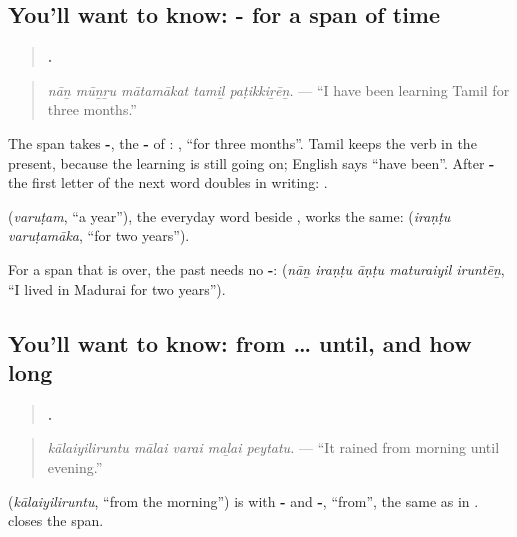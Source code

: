 \subsection*{You'll want to know: - for a span of time}
\begin{quote}
\textbf{    .}
\end{quote}

\begin{quote}
\emph{nāṉ mūṉṟu mātamākat tamiḻ paṭikkiṟēṉ.} — \textquotedblleft{}I have been learning Tamil for three months.\textquotedblright{}
\end{quote}

The span takes \textbf{-}, the \textbf{-} of \textbf{}: \textbf{ }, \textquotedblleft{}for three months\textquotedblright{}. Tamil keeps the verb in the present, because the learning is still going on; English says \textquotedblleft{}have been\textquotedblright{}. After \textbf{-} the first letter of the next word doubles in writing: \textbf{ }.

\textbf{} (\emph{varuṭam}, \textquotedblleft{}a year\textquotedblright{}), the everyday word beside \textbf{}, works the same: \textbf{ } (\emph{iraṇṭu varuṭamāka}, \textquotedblleft{}for two years\textquotedblright{}).

For a span that is over, the past needs no \textbf{-}: \textbf{    } (\emph{nāṉ iraṇṭu āṇṭu maturaiyil iruntēṉ}, \textquotedblleft{}I lived in Madurai for two years\textquotedblright{}).

\subsection*{You'll want to know: from … until, and how long}
\begin{quote}
\textbf{    .}
\end{quote}

\begin{quote}
\emph{kālaiyiliruntu mālai varai maḻai peytatu.} — \textquotedblleft{}It rained from morning until evening.\textquotedblright{}
\end{quote}

\textbf{} (\emph{kālaiyiliruntu}, \textquotedblleft{}from the morning\textquotedblright{}) is \textbf{} with \textbf{-} and \textbf{-}, \textquotedblleft{}from\textquotedblright{}, the same \textbf{} as in \textbf{}. \textbf{} closes the span.

